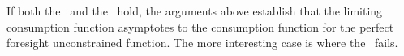 \documentclass[BufferStockTheory]{subfiles}
\begin{document}
If both the \GIC~and the \RIC~hold, the arguments above establish that the limiting consumption
function asymptotes to the consumption function for the perfect foresight unconstrained function.
The more interesting case is where the \GIC~fails.
\begin{comment}
  \WW{}{The same
    steps as above lead to the same implication that this requires
    $\InvEpShkInv < (\Rfree/\PGro)^{1/\CRRA}\uInvEpShkuInv^{1-1/\CRRA}$,
    but when the \RIC~$\Rfree/\PGro > 1$ holds this condition is much more
    easily satisfied.}
  If the \FVAC~holds but the \GIC~does not, the parameters must satisfy:
  \begin{equation}\begin{gathered}\begin{aligned}
    \DiscFac \PGro^{1-\CRRA}\Ex[\pshk^{1-\CRRA}] & < 1 < (\Rfree\DiscFac)^{1/\CRRA}(\PGro\Ex[\pshk^{-1}])^{-1}. \label{eq:FVACnotGIC}
  \end{aligned}\end{gathered}\end{equation}

  Note first that by Jensens's inequality $\Ex[\pshk^{1-\CRRA}] > 1$ and $(\Ex[\pshk^{-1}])^{-1} < 1$,
  so \eqref{eq:FVACnotGIC} is stronger than
  \begin{equation}\begin{gathered}\begin{aligned}
    \DiscFac \PGro^{1-\CRRA} & < 1 < (\Rfree\DiscFac)^{1/\CRRA}/\PGro. \label{eq:PFFVACnotPFGIC}
  \end{aligned}\end{gathered}\end{equation}


  Suppose $\PGro=1$, $\CRRA=2$ and $\pshk$ is lognormally distributed with $\sigma^{2}_{\pshk}=0.01$ (that is, $\log \pshk \sim \mathcal{N}(-\sigma_{\psi}^{2}/2,\sigma_{\psi}^{2})$) so that $\Ex_{t}[\pshk_{t+1}^{1-\CRRA}] =\Ex_{t}[\pshk_{t+1}^{-1}] =\exp(\sigma^{2}_{\psi})=e^{0.01}.$  Then the condition becomes
  \begin{equation}\begin{gathered}\begin{aligned}
    \DiscFac e^{0.01} & < 1 < (\Rfree \DiscFac)^{1/2}e^{-0.01}
  \end{aligned}\end{gathered}\end{equation}
  which can be satisfied, for example, by $\DiscFac = 0.96$ and $\Rfree=1.08$.
\end{comment}
\end{document}
